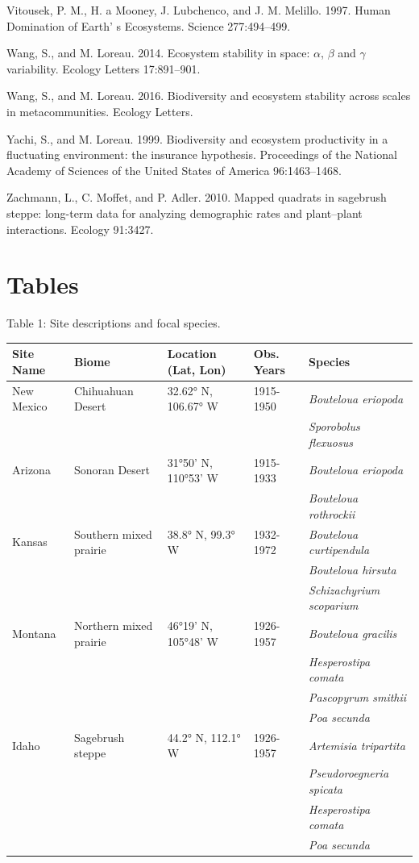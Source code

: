 \documentclass[12pt,]{article}
\begin{document}
Vitousek, P. M., H. a Mooney, J. Lubchenco, and J. M. Melillo. 1997.
Human Domination of Earth' s Ecosystems. Science 277:494--499.

Wang, S., and M. Loreau. 2014. Ecosystem stability in space: \(\alpha\),
\(\beta\) and \(\gamma\) variability. Ecology Letters 17:891--901.

Wang, S., and M. Loreau. 2016. Biodiversity and ecosystem stability
across scales in metacommunities. Ecology Letters.

Yachi, S., and M. Loreau. 1999. Biodiversity and ecosystem productivity
in a fluctuating environment: the insurance hypothesis. Proceedings of
the National Academy of Sciences of the United States of America
96:1463--1468.

Zachmann, L., C. Moffet, and P. Adler. 2010. Mapped quadrats in
sagebrush steppe: long-term data for analyzing demographic rates and
plant--plant interactions. Ecology 91:3427.

\newpage{}

\section{Tables}

Table 1: Site descriptions and focal species. \footnotesize

\begin{longtable}[c]{@{}lllll@{}}
\toprule
Site Name & Biome & Location (Lat, Lon) & Obs. Years &
Species\tabularnewline
\midrule
\endhead
New Mexico & Chihuahuan Desert & 32.62° N, 106.67° W & 1915-1950 &
\emph{Bouteloua eriopoda}\tabularnewline
& & & & \emph{Sporobolus flexuosus}\tabularnewline
Arizona & Sonoran Desert & 31°50' N, 110°53' W & 1915-1933 &
\emph{Bouteloua eriopoda}\tabularnewline
& & & & \emph{Bouteloua rothrockii}\tabularnewline
Kansas & Southern mixed prairie & 38.8° N, 99.3° W & 1932-1972 &
\emph{Bouteloua curtipendula}\tabularnewline
& & & & \emph{Bouteloua hirsuta}\tabularnewline
& & & & \emph{Schizachyrium scoparium}\tabularnewline
Montana & Northern mixed prairie & 46°19' N, 105°48' W & 1926-1957 &
\emph{Bouteloua gracilis}\tabularnewline
& & & & \emph{Hesperostipa comata}\tabularnewline
& & & & \emph{Pascopyrum smithii}\tabularnewline
& & & & \emph{Poa secunda}\tabularnewline
Idaho & Sagebrush steppe & 44.2° N, 112.1° W & 1926-1957 &
\emph{Artemisia tripartita}\tabularnewline
& & & & \emph{Pseudoroegneria spicata}\tabularnewline
& & & & \emph{Hesperostipa comata}\tabularnewline
& & & & \emph{Poa secunda}\tabularnewline
\bottomrule
\end{longtable}
\end{document}
